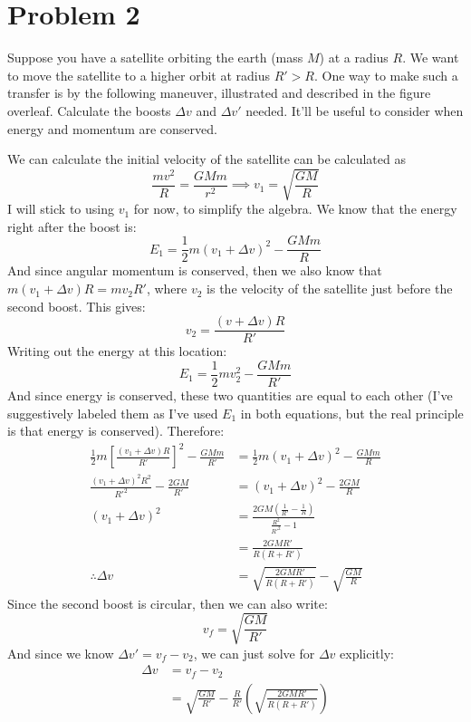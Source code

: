 \documentclass[10pt]{article}
\begin{document}
	\pagebreak

	\section*{Problem 2}
	Suppose you have a satellite orbiting the earth (mass $M$) at a radius $R$. We want to move the satellite
	to a higher orbit at radius $R' > R$. One way to make such a transfer is by the following maneuver, 
	illustrated and described in the figure overleaf. Calculate the boosts $\Delta v$ and $\Delta v'$ needed.
	It'll be useful to consider when energy and momentum are conserved. 
	
	\begin{solution}
			We can calculate the initial velocity of the satellite can be calculated as 
			\[ \frac{mv^2}{R} = \frac{GMm}{r^2} \implies v_1 = \sqrt{\frac{GM}{R}} \]
			I will stick to using $v_1$ for now, to simplify the algebra. We know that the energy right after 
			the boost is:
			\[
			E_1 = \frac{1}{2}m(v_1 + \Delta v)^2 - \frac{GMm}{R}
			\] 
			And since angular momentum is conserved, then we also know that $m(v_1 + \Delta v)R = mv_2R'$, 
			where $v_2$ is the velocity of the satellite just before the second boost. This gives: 
			\[
			v_2 = \frac{(v + \Delta v)R}{R'}
			\] 
			Writing out the energy at this location: 
			\[
			E_1 = \frac{1}{2}m v_2^2 - \frac{GMm}{R'}
			\] 
			And since energy is conserved, these two quantities are equal to each other (I've suggestively 
			labeled them as I've used $E_1$ in both equations, but the real principle is that energy is 
			conserved). Therefore: 
			\begin{align*}
					\frac{1}{2}m \left[ \frac{(v_1 + \Delta v)R}{R'} \right]^2 - \frac{GMm}{R'} &= 
					\frac{1}{2}m (v_1 + \Delta v)^2 - \frac{GMm}{R}\\
					\frac{(v_1 + \Delta v)^2 R^2}{R'^2} - \frac{2GM}{R'} &=  (v_1 + \Delta v)^2 - \frac{2GM}{R} \\
					(v_1 + \Delta v)^2 &=
					\frac{2GM\left( \frac{1}{R'} - \frac{1}{R} \right) }{\frac{R^2}{R'^2} - 1} \\
									   &=  \frac{2GMR'}{R(R + R')} \\
					\therefore \Delta v &= \sqrt{\frac{2GMR'}{R(R + R')}} - \sqrt{\frac{GM}{R}} 
			\end{align*}
			Since the second boost is circular, then we can also write:
			\[
			v_f = \sqrt{\frac{GM}{R'}} 
			\] 
			And since we know $\Delta v' = v_f - v_2$, we can just solve for $\Delta v$ explicitly: 
			\begin{align*}
					\Delta v &= v_f - v_2 \\
					&= \sqrt{\frac{GM}{R'}}- \frac{R}{R'}\left( \sqrt{\frac{2GMR'}{R(R + R')}}  \right) 
			\end{align*}
			
	\end{solution}
	
\end{document}
